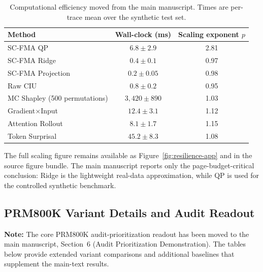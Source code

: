 \documentclass[a4paper,fleqn]{cas-sc}
\begin{document}
\begin{table}[ht]
\caption{Computational efficiency moved from the main manuscript. Times are per-trace mean over the synthetic test set.}
\label{tab:supp-efficiency}
\centering
\small
\begin{tabular}{lcc}
\toprule
\textbf{Method} & \textbf{Wall-clock (ms)} & \textbf{Scaling exponent $p$} \\
\midrule
SC-FMA QP & $6.8 \pm 2.9$ & 2.81 \\
SC-FMA Ridge & $0.4 \pm 0.1$ & 0.97 \\
SC-FMA Projection & $0.2 \pm 0.05$ & 0.98 \\
Raw CIU & $0.8 \pm 0.2$ & 0.95 \\
MC Shapley (500 permutations) & $3{,}420 \pm 890$ & 1.03 \\
Gradient$\times$Input & $12.4 \pm 3.1$ & 1.12 \\
Attention Rollout & $8.1 \pm 1.7$ & 1.15 \\
Token Surprisal & $45.2 \pm 8.3$ & 1.08 \\
\bottomrule
\end{tabular}
\end{table}

The full scaling figure remains available as Figure~\ref{fig:resilience-app} and in the source figure bundle. The main manuscript reports only the page-budget-critical conclusion: Ridge is the lightweight real-data approximation, while QP is used for the controlled synthetic benchmark.

\subsection{PRM800K Variant Details and Audit Readout}
\label{app:prm800k-variant-details}

\noindent\textbf{Note:} The core PRM800K audit-prioritization readout has been moved to the main manuscript, Section~6 (Audit Prioritization Demonstration). The tables below provide extended variant comparisons and additional baselines that supplement the main-text results.
\end{document}
